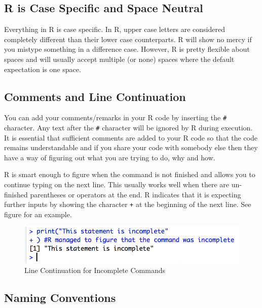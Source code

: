 \documentclass[]{krantz}
\theoremstyle{definition}
\theoremstyle{definition}
\theoremstyle{definition}
\theoremstyle{remark}
\begin{document}
\subsection{R is Case Specific and Space
Neutral}\label{r-is-case-specific-and-space-neutral}

Everything in R is case specific. In R, upper case letters are
considered completely different than their lower case counterparts. R
will show no mercy if you mistype something in a difference case.
However, R is pretty flexible about spaces and will usually accept
multiple (or none) spaces where the default expectation is one space.

\subsection{Comments and Line
Continuation}\label{comments-and-line-continuation}

You can add your comments/remarks in your R code by inserting the
\texttt{\#} character. Any text after the \texttt{\#} character will be
ignored by R during execution. It is essential that sufficient comments
are added to your R code so that the code remains understandable and if
you share your code with somebody else then they have a way of figuring
out what you are trying to do, why and how.

R is smart enough to figure when the command is not finished and allows
you to continue typing on the next line. This usually works well when
there are un-finished parentheses or operators at the end. R indicates
that it is expecting further inputs by showing the character \texttt{+}
at the beginning of the next line. See figure for an example.

\begin{figure}

{\centering \includegraphics[width=0.5\linewidth]{images/incomplete} 

}

\caption{Line Continuation for Incomplete Commands}\label{fig:unnamed-chunk-10}
\end{figure}

\subsection{Naming Conventions}\label{naming-conventions}
\end{document}
